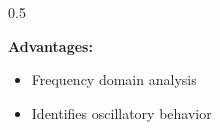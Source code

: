 \begin{frame}
\begin{columns}
\begin{column}{0.5\textwidth}
{            \textbf{Advantages:}
            \begin{itemize}
                \item Frequency domain analysis
                \item Identifies oscillatory behavior
            \end{itemize}
            }
        \end{column}
    \end{columns}

\end{frame}

